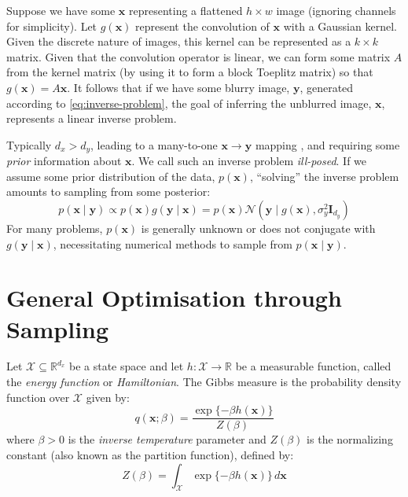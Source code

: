 \begin{example}
    Suppose we have some $\mathbf{x}$ representing a flattened $h\times w$ image (ignoring channels
    for simplicity). Let $g(\mathbf{x})$ represent the convolution of $\mathbf{x}$ with a Gaussian
    kernel. Given the discrete nature of images, this kernel can be represented as a
    $k \times k$ matrix. Given that the convolution operator is linear, we can form some matrix $A$
    from the kernel matrix (by using it to form a block Toeplitz matrix) so that
    $g(\mathbf{x}) = A\mathbf{x}$. It follows that if we have some blurry image, $\mathbf{y}$,
    generated according to \ref{eq:inverse-problem}, the goal of inferring the unblurred image,
    $\mathbf{x}$, represents a linear inverse problem.
\end{example}

\begin{remark}
    Typically $d_x > d_y$, leading to a many-to-one $\mathbf{x} \rightarrow \mathbf{y}$ mapping
    \parencite{chungDiffusionPosteriorSampling2022}, and requiring some \emph{prior} information
    about $\mathbf{x}$. We call such an inverse problem \emph{ill-posed}. If we assume some prior
    distribution of the data, $p(\mathbf{x})$, ``solving'' the inverse problem amounts to sampling
    from some posterior:
    \begin{equation*}
        p(\mathbf{x} \mid \mathbf{y}) \propto p(\mathbf{x})g(\mathbf{y} \mid \mathbf{x})
        = p(\mathbf{x})\mathcal{N}\left(\mathbf{y} \mid g(\mathbf{x}), \sigma^2_y\mathbf{I}_{d_y}\right)
    \end{equation*}
    For many problems, $p(\mathbf{x})$ is generally unknown or does not conjugate with
    $g(\mathbf{y} \mid \mathbf{x})$, necessitating numerical methods to sample from
    $p(\mathbf{x} \mid \mathbf{y})$.
\end{remark}

\section{General Optimisation through Sampling}\label{sec:general-optimisation}

\begin{definition}
    Let $\mathcal{X} \subseteq \mathbb{R}^{d_x}$ be a state space and let
    $h: \mathcal{X} \rightarrow \mathbb{R}$ be a measurable function, called the
    \emph{energy function} or \emph{Hamiltonian}. The Gibbs measure is the probability density
    function over $\mathcal{X}$ given by:
    \begin{equation}
        q(\mathbf{x}; \beta) = \frac{\exp\{-\beta h(\mathbf{x})\}}{Z(\beta)} \label{eq:gibbs-measure}
    \end{equation}
    where $\beta > 0$ is the \emph{inverse temperature} parameter and $Z(\beta)$ is the normalizing
    constant (also known as the partition function), defined by:
    \begin{equation*}
        Z(\beta) = \int_{\mathcal{X}} \exp\{-\beta h(\mathbf{x})\} \, d\mathbf{x}
    \end{equation*}
\end{definition}

